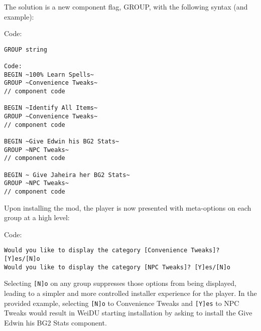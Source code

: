 \documentclass{article}
\begin{document}
The solution is a new component flag, GROUP, with the following syntax (and example):

Code:
\begin{verbatim}GROUP string

Code:
BEGIN ~100% Learn Spells~
GROUP ~Convenience Tweaks~
// component code

BEGIN ~Identify All Items~
GROUP ~Convenience Tweaks~
// component code

BEGIN ~Give Edwin his BG2 Stats~
GROUP ~NPC Tweaks~
// component code

BEGIN ~ Give Jaheira her BG2 Stats~
GROUP ~NPC Tweaks~
// component code
\end{verbatim}

Upon installing the mod, the player is now presented with meta-options on
each group at a high level:

Code:
\begin{verbatim}
Would you like to display the category [Convenience Tweaks]? [Y]es/[N]o
Would you like to display the category [NPC Tweaks]? [Y]es/[N]o
\end{verbatim}

Selecting \verb+[N]o+ on any group suppresses those options from being
displayed, leading to a simpler and more controlled installer experience for
the player. In the provided example, selecting \verb+[N]o+ to Convenience
Tweaks and \verb+[Y]es+ to NPC Tweaks would result in WeiDU starting
installation by asking to install the Give Edwin his BG2 Stats component.
\end{document}
